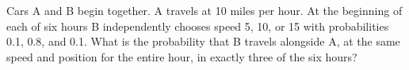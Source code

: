 Cars A and B begin together. A travels at 10 miles per hour. At the beginning of each of six hours B independently chooses speed 5, 10, or 15 with probabilities 0.1, 0.8, and 0.1. What is the probability that B travels alongside A, at the same speed and position for the entire hour, in exactly three of the six hours?
